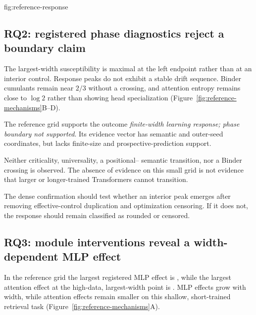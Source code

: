 {fig:reference-response}

\subsection{RQ2: registered phase diagnostics reject a boundary claim}

 The largest-width susceptibility is maximal at the left
endpoint rather than at an interior control. Response peaks do not exhibit a
stable drift sequence. Binder cumulants remain near $2/3$ without a crossing,
and attention entropy remains close to $\log 2$ rather than showing head
specialization (Figure~\ref{fig:reference-mechanisms}B--D).

 The reference grid supports the outcome
\emph{finite-width learning response; phase boundary not supported}. Its
evidence vector has semantic and outer-seed coordinates, but lacks finite-size
and prospective-prediction support.

 Neither criticality, universality, a positional--
semantic transition, nor a Binder crossing is observed. The absence of evidence
on this small grid is not evidence that larger or longer-trained Transformers
cannot transition.

 The dense confirmation should test whether an interior
peak emerges after removing effective-control duplication and optimization
censoring. If it does not, the response should remain classified as rounded or
censored.

\subsection{RQ3: module interventions reveal a width-dependent MLP effect}

 In the reference grid the largest registered MLP effect is
\ReferenceLargestMLPEffect{}, while the largest attention effect at the
high-data, largest-width point is \ReferenceLargestAttentionEffect{}. MLP
effects grow with width, while attention effects remain smaller on this shallow,
short-trained retrieval task (Figure~\ref{fig:reference-mechanisms}A).

